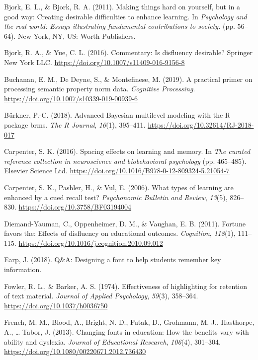 \documentclass[english,doc]{apa6}
\begin{document}
\leavevmode\hypertarget{ref-Bjork2011}{}%
Bjork, E. L., \& Bjork, R. A. (2011). Making things hard on yourself, but in a good way: Creating desirable difficulties to enhance learning. In \emph{Psychology and the real world: Essays illustrating fundamental contributions to society.} (pp. 56--64). New York, NY, US: Worth Publishers.

\leavevmode\hypertarget{ref-Bjork2016}{}%
Bjork, R. A., \& Yue, C. L. (2016). Commentary: Is disfluency desirable? Springer New York LLC. \url{https://doi.org/10.1007/s11409-016-9156-8}

\leavevmode\hypertarget{ref-Buchanan2019}{}%
Buchanan, E. M., De Deyne, S., \& Montefinese, M. (2019). A practical primer on processing semantic property norm data. \emph{Cognitive Processing}. \url{https://doi.org/10.1007/s10339-019-00939-6}

\leavevmode\hypertarget{ref-Burkner2018}{}%
Bürkner, P.-C. (2018). Advanced Bayesian multilevel modeling with the R package brms. \emph{The R Journal}, \emph{10}(1), 395--411. \url{https://doi.org/10.32614/RJ-2018-017}

\leavevmode\hypertarget{ref-Carpenter2016}{}%
Carpenter, S. K. (2016). Spacing effects on learning and memory. In \emph{The curated reference collection in neuroscience and biobehavioral psychology} (pp. 465--485). Elsevier Science Ltd. \url{https://doi.org/10.1016/B978-0-12-809324-5.21054-7}

\leavevmode\hypertarget{ref-Carpenter2006}{}%
Carpenter, S. K., Pashler, H., \& Vul, E. (2006). What types of learning are enhanced by a cued recall test? \emph{Psychonomic Bulletin and Review}, \emph{13}(5), 826--830. \url{https://doi.org/10.3758/BF03194004}

\leavevmode\hypertarget{ref-Diemand-Yauman2011}{}%
Diemand-Yauman, C., Oppenheimer, D. M., \& Vaughan, E. B. (2011). Fortune favors the: Effects of disfluency on educational outcomes. \emph{Cognition}, \emph{118}(1), 111--115. \url{https://doi.org/10.1016/j.cognition.2010.09.012}

\leavevmode\hypertarget{ref-Earp2018}{}%
Earp, J. (2018). Q\&A: Designing a font to help students remember key information.

\leavevmode\hypertarget{ref-Fowler1974}{}%
Fowler, R. L., \& Barker, A. S. (1974). Effectiveness of highlighting for retention of text material. \emph{Journal of Applied Psychology}, \emph{59}(3), 358--364. \url{https://doi.org/10.1037/h0036750}

\leavevmode\hypertarget{ref-French2013}{}%
French, M. M., Blood, A., Bright, N. D., Futak, D., Grohmann, M. J., Hasthorpe, A., \ldots{} Tabor, J. (2013). Changing fonts in education: How the benefits vary with ability and dyslexia. \emph{Journal of Educational Research}, \emph{106}(4), 301--304. \url{https://doi.org/10.1080/00220671.2012.736430}
\end{document}
